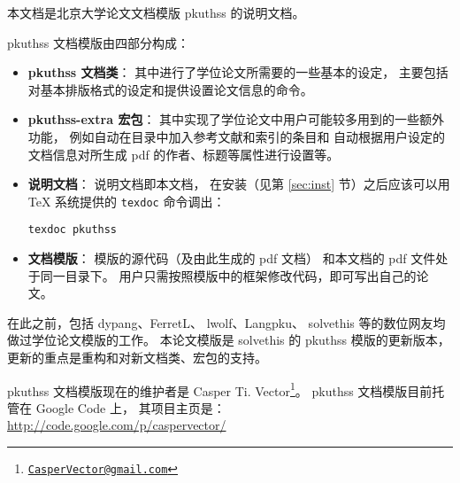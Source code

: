 %
%
%
%
%


本文档是北京大学论文文档模版 pkuthss 的说明文档。

pkuthss 文档模版由四部分构成：
\begin{itemize}
	\item \textbf{pkuthss 文档类}：
		其中进行了学位论文所需要的一些基本的设定，
		主要包括对基本排版格式的设定和提供设置论文信息的命令。
	\item \textbf{pkuthss-extra 宏包}：
		其中实现了学位论文中用户可能较多用到的一些额外功能，
		例如自动在目录中加入参考文献和索引的条目和%
		自动根据用户设定的文档信息对所生成 pdf 的作者、标题等属性进行设置等。
	\item \textbf{说明文档}：
		说明文档即本文档，
		在安装（见第 \ref{sec:inst} 节）之后应该可以用 \TeX{} 系统提供的
		\verb|texdoc| 命令调出：
\begin{Verbatim}[frame=single]
texdoc pkuthss
\end{Verbatim}
	\item \textbf{文档模版}：
		模版的源代码（及由此生成的 pdf 文档）
		和本文档的 pdf 文件处于同一目录下。
		用户只需按照模版中的框架修改代码，即可写出自己的论文。
\end{itemize}

在此之前，包括 dypang\supercite{dypang}、FerretL\supercite{FerretL}、%
lwolf\supercite{lwolf}、Langpku\supercite{Langpku}、%
solvethis\supercite{solvethis} 等的数位网友均做过学位论文模版的工作。
本论文模版是 solvethis 的 pkuthss 模版的更新版本，
更新的重点是重构和对新文档类、宏包的支持。

pkuthss 文档模版现在的维护者是 Casper Ti. Vector\footnote%
{\href{mailto:CasperVector@gmail.com}{\texttt{CasperVector@gmail.com}}}。%
pkuthss 文档模版目前托管在 Google Code 上，
其项目主页是：\\
\hspace*{\parindent}\url{http://code.google.com/p/caspervector/}

